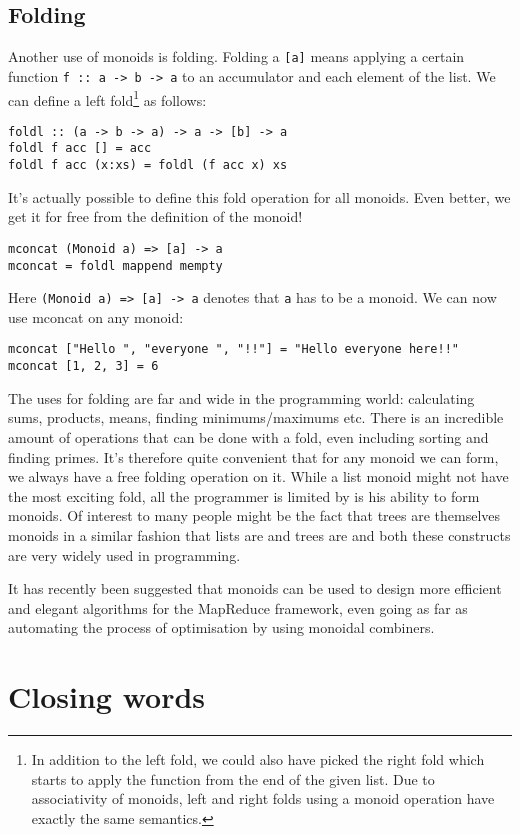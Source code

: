 \documentclass{acm_proc_article-sp}
\begin{document}
\subsection{Folding}
Another use of monoids is folding. Folding a \texttt{[a]} means applying a
certain function \texttt{f :: a -> b -> a} to an accumulator and each element
of the list. We can define a left fold\footnote{In addition to the
  left fold, we could also have picked the right fold which starts to
  apply the function from the end of the given list. Due to
  associativity of monoids, left and right folds using a monoid
  operation have exactly the same semantics.} as follows:
\begin{lstlisting}
foldl :: (a -> b -> a) -> a -> [b] -> a
foldl f acc [] = acc
foldl f acc (x:xs) = foldl (f acc x) xs
\end{lstlisting}
It's actually possible to define this fold operation for all
monoids. Even better, we get it for free from the definition of the
monoid!
\begin{lstlisting}
mconcat (Monoid a) => [a] -> a
mconcat = foldl mappend mempty
\end{lstlisting}
Here
\texttt{(Monoid a) => [a] -> a} denotes that \texttt{a} has to be a
monoid. We can now use mconcat on any monoid:
\begin{lstlisting}
mconcat ["Hello ", "everyone ", "!!"] = "Hello everyone here!!"
mconcat [1, 2, 3] = 6
\end{lstlisting}
The uses for folding are far and wide in the programming world:
calculating sums, products, means, finding minimums/maximums etc. There is an
incredible amount of operations that can be done with a fold, even
including sorting and finding primes\cite{haskell:fold}. It's
therefore quite convenient that for any monoid we can form, we always
have a free folding operation on it. While a list monoid might not
have the most exciting fold, all the programmer is limited by is his
ability to form monoids. Of interest to many people might be the fact
that trees are themselves monoids in a similar fashion that lists are
and trees are and both these constructs are very widely used in programming.

It has recently been suggested that monoids can be used to design more
efficient and elegant algorithms for the MapReduce framework, even
going as far as automating the process of optimisation by using
monoidal combiners.\cite{Lin:monodify}

\section{Closing words}
\end{document}
